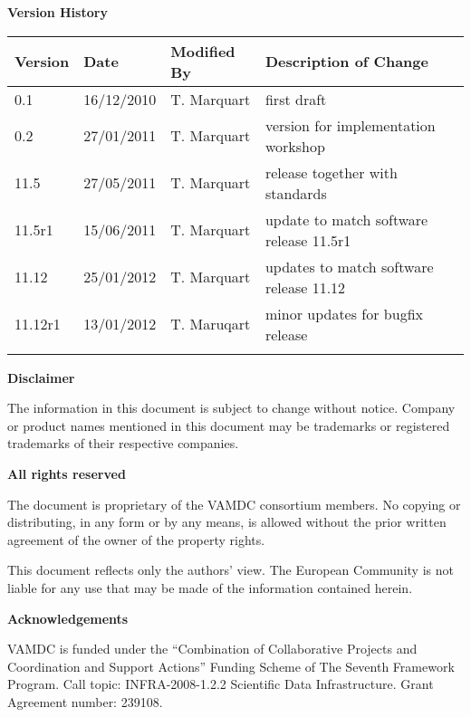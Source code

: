 {\begin{titlepage}
\end{titlepage}

\noindent \textbf{Version History}

\textbf{}

\noindent \begin{tabular}{|l|l|l|l|} 
\hline 
\textbf{Version} & \textbf{Date} & \textbf{Modified By} & \textbf{Description of Change} \\ \hline 
0.1 & 16/12/2010 & T. Marquart & first draft \\ \hline 
0.2 & 27/01/2011 & T. Marquart & version for implementation workshop \\ \hline 
11.5 & 27/05/2011 & T. Marquart & release together with standards \\ \hline 
11.5r1 & 15/06/2011 & T. Marquart & update to match software release 11.5r1 \\ \hline 
11.12 & 25/01/2012 & T. Marquart & updates to match software release 11.12 \\ \hline 
11.12r1 & 13/01/2012 & T. Maruqart & minor updates for bugfix release \\ \hline 
 &  &  &  \\ \hline 
\end{tabular}

\textbf{}

\noindent \textbf{Disclaimer}

\noindent The information in this document is subject to change without notice. Company or product names mentioned in this document may be trademarks or registered trademarks of their respective companies.


\textbf{}

\noindent \textbf{All rights reserved}

\noindent The document is proprietary of the VAMDC consortium members. No copying or distributing, in any form or by any means, is allowed without the prior written agreement of the owner of the property rights.

\noindent 

\noindent This document reflects only the authors' view. The European Community is not liable for any use that may be made of the information contained herein.

\textbf{}

\noindent \textbf{Acknowledgements}

\noindent VAMDC is funded under the ``Combination of Collaborative Projects and Coordination and  Support Actions'' Funding Scheme of The Seventh Framework Program. Call topic: INFRA-2008-1.2.2 Scientific Data Infrastructure. Grant Agreement number: 239108.

\textbf{}

}
